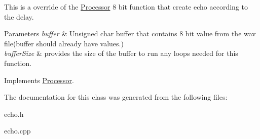 This is a override of the \hyperlink{classProcessor}{Processor} 8 bit function that create echo according to the delay. 


\begin{DoxyParams}{Parameters}
{\em buffer} & Unsigned char buffer that contains 8 bit value from the wav file(buffer should already have values.) \\
\hline
{\em buffer\+Size} & provides the size of the buffer to run any loops needed for this function. \\
\hline
\end{DoxyParams}


Implements \hyperlink{classProcessor}{Processor}.



The documentation for this class was generated from the following files\+:\begin{DoxyCompactItemize}
\item 
echo.\+h\item 
echo.\+cpp\end{DoxyCompactItemize}
